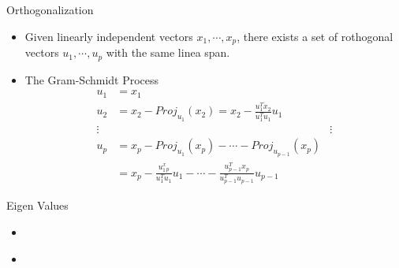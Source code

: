 \documentclass[landscape]{slides}
\begin{document}
\begin{slide}{\Large Orthogonalization}
\begin{itemize}
    \item Given linearly independent vectors $x_1,\cdots, x_p$, there exists a set of rothogonal vectors $u_1,\cdots,u_p$ with the same linea span. 
    \item The Gram-Schmidt Process
    \begin{align*}
        u_1 &=x_1 &\\
        u_2 &= x_2 - Proj_{u_1}(x_2) = x_2 - \frac{u_1^Tx_2}{u_1^Tu_1}u_1&\\
        \vdots & &\vdots\\
        u_p &= x_p - Proj_{u_1}(x_p) - \cdots - Proj_{u_{p-1}}(x_p) &\\
        &= x_p - \frac{u_1^x_p}{u_1^Tu_1}u_1-\cdots-\frac{u_{p-1}^Tx_p}{u_{p-1}^T u_{p-1}}u_{p-1} &
    \end{align*}
\end{itemize}
\end{slide}  

\begin{slide}{\Large Eigen Values}
\begin{itemize}
    \item
\end{itemize}
\end{slide}  

\begin{slide}{\Large }
\begin{itemize}
    \item
\end{itemize}
\end{slide}  
\end{document}
